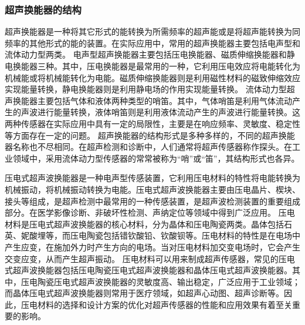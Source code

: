     \subsubsection{超声换能器的结构}
    超声换能器是一种将其它形式的能转换为所需频率的超声能或是将超声能转换为同频率的其他形式的能的装置。在实际应用中，常用的超声换能器主要包括电声型和流体动力型两类。
    电声型超声换能器主要包括压电换能器、磁质伸缩换能器和静电换能器三种。其中，压电换能器是最常用的一种，它利用压电效应将电能转化为机械能或将机械能转化为电能。磁质伸缩换能器则是利用磁性材料的磁致伸缩效应实现能量转换，静电换能器则是利用静电场的作用实现能量转换。
    流体动力型超声换能器主要包括气体和液体两种类型的哨笛。其中，气体哨笛是利用气体流动产生的声波进行能量转换，液体哨笛则是利用液体流动产生的声波进行能量转换。这两种传感器在实际应用中具有一定的局限性，主要是在响应频率、灵敏度、稳定性等方面存在一定的问题。
    超声换能器的结构形式是多种多样的，不同的超声换能器名称也不尽相同。在超声检测和诊断中，人们通常将超声传感器称作探头。在工业领域中，采用流体动力型传感器的常常被称为“哨”或“笛”，其结构形式也各异。\par
    压电式超声波换能器是一种电声型传感装置，它利用压电材料的特性将电能转换为机械振动，将机械振动转换为电能。压电式超声波换能器主要由压电晶片、楔块、接头等组成，是超声检测中最常用的一种传感装置，是超声波检测装置的重要组成部分。在医学影像诊断、非破坏性检测、声纳定位等领域中得到广泛应用。
    压电材料是压电式超声波换能器的核心材料，分为晶体和压电陶瓷两类。晶体包括石英、妮酸埋等，而压电陶瓷包括错钦酸铅、钦酸钡等。压电材料的特性是在电场中产生应变，在施加外力时产生方向的电场。当对压电材料加交变电场时，它会产生交变应变，从而产生超声振动。
    压电材料可以用来制成超声传感器，常见的压电式超声波换能器包括压电陶瓷压电式超声波换能器和晶体压电式超声波换能器。其中，压电陶瓷压电式超声波换能器的灵敏度高、输出稳定，广泛应用于工业领域；而晶体压电式超声波换能器则常用于医疗领域，如超声心动图、超声诊断等。因此，压电材料的选择和设计方案的优化对超声传感器的性能和应用效果有着至关重要的影响。\par
